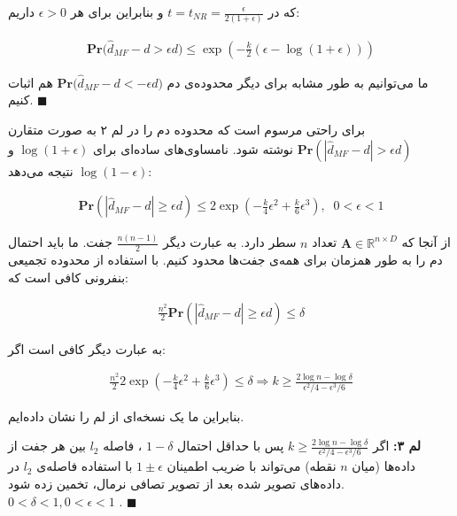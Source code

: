 که در 
$t = t_{NR} = \frac{\epsilon}{2(1+\epsilon)}$
و بنابراین برای هر 
$\epsilon > 0$
داریم:

\begin{align}
\mathbf{Pr} \big( \hat{d}_{MF} - d > \epsilon d) \leq \exp \left( -\frac{k}{2} \left( \epsilon - \log \left( 1 + \epsilon \right) \right) \right)
\label{eq:1iH}
\end{align}

ما می‌توانیم به طور مشابه برای دیگر محدوده‌ی دم 
$\mathbf{Pr} \big( \hat{d}_{MF} - d < -\epsilon d)$
هم اثبات کنیم.
$\blacksquare$

\bigskip

برای راحتی مرسوم است که محدوده دم را در لم ۲ به صورت متقارن 
$\mathbf{Pr} \left( \left| \hat{d}_{MF} - d \right| > \epsilon d \right)$
نوشته شود. نامساوی‌های ساده‌ای برای 
$\log(1+\epsilon)$
و 
$\log(1-\epsilon)$
نتیجه می‌دهد:

\begin{align}
\mathbf{Pr} \left( \left| \hat{d}_{MF} - d \right| \geq \epsilon d \right) \leq 2 \exp \left( - \frac{k}{4} \epsilon^2 + \frac{k}{6} \epsilon^3 \right),\;\; 0 < \epsilon < 1
\label{eq:1iI}
\end{align}

از آنجا که 
$\mathbf{A} \in \mathbb{R}^{n \times D}$
تعداد 
$n$ 
سطر دارد. به عبارت دیگر 
$\frac{n(n-1)}{2}$
جفت. ما باید احتمال دم را به طور همزمان برای همه‌ی جفت‌ها محدود کنیم. با استفاده از محدوده تجمیعی بنفرونی%
کافی است که:

\begin{align}
\frac{n^2}{2} \mathbf{Pr} \left( \left| \hat{d}_{MF} - d \right| \geq \epsilon d \right) \leq \delta
\label{eq:1iJ}
\end{align}

به عبارت دیگر کافی است اگر:

\begin{align}
\frac{n^2}{2} 2 \exp \left( - \frac{k}{4} \epsilon^2 + \frac{k}{6} \epsilon^3 \right) \leq \delta 
\Rightarrow
k \geq \frac{2 \log n - \log \delta}{\epsilon^2 / 4 - \epsilon^3 / 6}
\label{eq:1iK}
\end{align}

بنابراین ما یک نسخه‌ای از لم 
را نشان داده‌ایم.

\textbf{
لم ۳:
}
اگر 
$k \geq \frac{2 \log n - \log \delta}{\epsilon^2 / 4 - \epsilon^3 / 6} $
پس با حداقل احتمال 
$1-\delta$
، فاصله 
$l_2$
بین هر جفت از داده‌ها (میان 
$n$
نقطه) می‌تواند با ضریب اطمینان
$1 \pm \epsilon$
با استفاده فاصله‌ی 
$l_2$
در داده‌های تصویر شده بعد از تصویر تصافی نرمال، تخمین زده شود.
$0 < \delta < 1, 0 < \epsilon < 1$
.
$\blacksquare$
\bigskip


